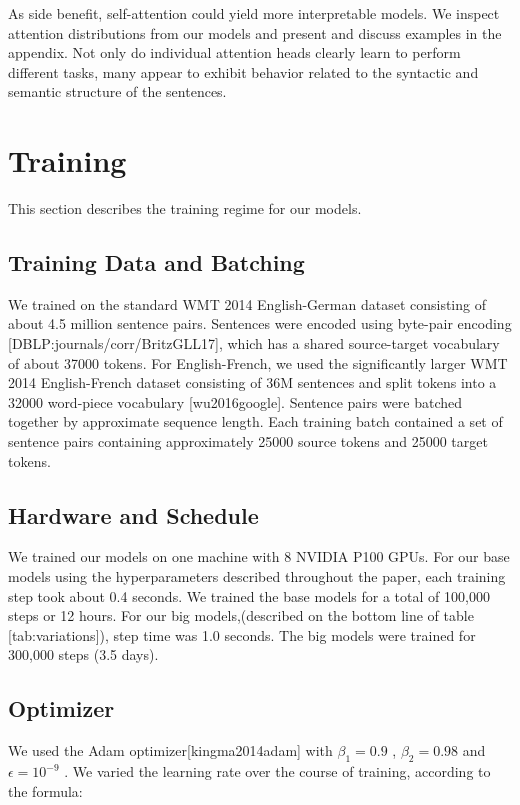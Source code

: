 \documentclass[11pt,a4paper]{article}
\begin{document}
As side benefit, self-attention could yield more interpretable models. We inspect attention distributions from our models and present and discuss examples in the appendix. Not only do individual attention heads clearly learn to perform different tasks, many appear to exhibit behavior related to the syntactic and semantic structure of the sentences.

\section{Training}

This section describes the training regime for our models.

\subsection{Training Data and Batching}

We trained on the standard WMT 2014 English-German dataset consisting of about 4.5 million sentence pairs.  Sentences were encoded using byte-pair encoding [DBLP:journals/corr/BritzGLL17], which has a shared source-target vocabulary of about 37000 tokens. For English-French, we used the significantly larger WMT 2014 English-French dataset consisting of 36M sentences and split tokens into a 32000 word-piece vocabulary [wu2016google].  Sentence pairs were batched together by approximate sequence length.  Each training batch contained a set of sentence pairs containing approximately 25000 source tokens and 25000 target tokens.

\subsection{Hardware and Schedule}

We trained our models on one machine with 8 NVIDIA P100 GPUs.  For our base models using the hyperparameters described throughout the paper, each training step took about 0.4 seconds.  We trained the base models for a total of 100,000 steps or 12 hours.  For our big models,(described on the bottom line of table [tab:variations]), step time was 1.0 seconds.  The big models were trained for 300,000 steps (3.5 days).

\subsection{Optimizer}

We used the Adam optimizer[kingma2014adam] with  $\beta_1=0.9$ ,  $\beta_2=0.98$  and  $\epsilon=10^{-9}$ .  We varied the learning rate over the course of training, according to the formula:
\end{document}
